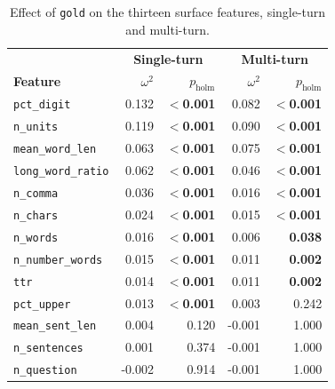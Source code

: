 \begin{table}[htbp]
    \centering
    \small
    \begin{tabular}{@{}lrrrr@{}}
        \toprule
        & \multicolumn{2}{c}{\textbf{Single-turn}} & \multicolumn{2}{c}{\textbf{Multi-turn}} \\
        \textbf{Feature} & $\omega^2$ & $p_{\text{holm}}$ & $\omega^2$ & $p_{\text{holm}}$ \\
        \midrule
        \texttt{pct\_digit}        & \cellcolor{omegaMedium}0.132 & \textbf{$<$0.001} & \cellcolor{omegaMedium}0.082 & \textbf{$<$0.001} \\
        \texttt{n\_units}          & \cellcolor{omegaMedium}0.119 & \textbf{$<$0.001} & \cellcolor{omegaMedium}0.090 & \textbf{$<$0.001} \\
        \texttt{mean\_word\_len}   & \cellcolor{omegaMedium}0.063 & \textbf{$<$0.001} & \cellcolor{omegaMedium}0.075 & \textbf{$<$0.001} \\
        \texttt{long\_word\_ratio} & \cellcolor{omegaMedium}0.062 & \textbf{$<$0.001} & \cellcolor{omegaSmall}0.046  & \textbf{$<$0.001} \\
        \texttt{n\_comma}          & \cellcolor{omegaSmall}0.036  & \textbf{$<$0.001} & \cellcolor{omegaSmall}0.016  & \textbf{$<$0.001} \\
        \texttt{n\_chars}          & \cellcolor{omegaSmall}0.024  & \textbf{$<$0.001} & \cellcolor{omegaSmall}0.015  & \textbf{$<$0.001} \\
        \texttt{n\_words}          & \cellcolor{omegaSmall}0.016  & \textbf{$<$0.001} & 0.006 & \textbf{0.038} \\
        \texttt{n\_number\_words}  & \cellcolor{omegaSmall}0.015  & \textbf{$<$0.001} & \cellcolor{omegaSmall}0.011  & \textbf{0.002} \\
        \texttt{ttr}               & \cellcolor{omegaSmall}0.014  & \textbf{$<$0.001} & \cellcolor{omegaSmall}0.011  & \textbf{0.002} \\
        \texttt{pct\_upper}        & \cellcolor{omegaSmall}0.013  & \textbf{$<$0.001} & 0.003 & 0.242 \\
        \texttt{mean\_sent\_len}   & 0.004 & 0.120 & -0.001 & 1.000 \\
        \texttt{n\_sentences}      & 0.001 & 0.374 & -0.001 & 1.000 \\
        \texttt{n\_question}       & -0.002 & 0.914 & -0.001 & 1.000 \\
        \bottomrule
    \end{tabular}
    \caption[Effect of \texttt{gold} on surface features, single-turn and multi-turn]{Effect of \texttt{gold} on the thirteen surface features, single-turn and multi-turn.}
    \label{tab:gold-omega2}
\end{table}

